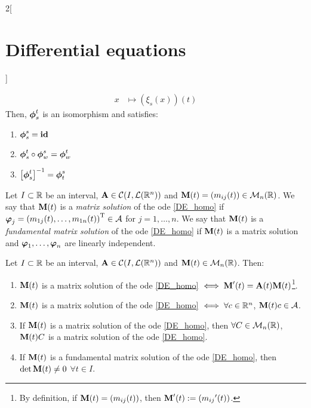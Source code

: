 \documentclass[../../../main.tex]{subfiles}
\begin{document}
\begin{multicols}{2}[\section{Differential equations}]
\begin{corollary}
\begin{align*}
      x                               & \longmapsto(\xi_s(x))(t)
    \end{align*}
    Then, $\boldsymbol{\mathrm{\phi}}_s^t$ is an isomorphism and satisfies:
    \begin{enumerate}
      \item $\boldsymbol{\mathrm{\phi}}_s^s=\boldsymbol{\mathrm{\mathrm{id}}}$
      \item $\boldsymbol{\mathrm{\phi}}_s^t\circ\boldsymbol{\mathrm{\phi}}_w^s=\boldsymbol{\mathrm{\phi}}_w^t$
      \item ${\left[\boldsymbol{\mathrm{\phi}}_s^t\right]}^{-1}=\boldsymbol{\mathrm{\phi}}_t^s$
    \end{enumerate}
  \end{corollary}
  \begin{definition}
    Let $I\subset \mathbb{R}$ be an interval, $\boldsymbol{\mathrm{A}}\in\mathcal{C}(I,\mathcal{L}(\mathbb{R}^n))$ and $\boldsymbol{\mathrm{M}}(t)=(m_{ij}(t))\in\mathcal{M}_n(\mathbb{R})$. We say that $\boldsymbol{\mathrm{M}}(t)$ is a \textit{matrix solution} of the ode \eqref{DE_homo} if $\boldsymbol{\mathrm{\varphi}}_j={(m_{1j}(t),\ldots,m_{1n}(t))}^\mathrm{T}\in\mathcal{A}$ for $j=1,\ldots,n$. We say that $\boldsymbol{\mathrm{M}}(t)$ is a \textit{fundamental matrix solution} of the ode \eqref{DE_homo} if $\boldsymbol{\mathrm{M}}(t)$ is a matrix solution and $\boldsymbol{\mathrm{\varphi}}_1,\ldots,\boldsymbol{\mathrm{\varphi}}_n$ are linearly independent.
  \end{definition}
  \begin{prop}
    Let $I\subset \mathbb{R}$ be an interval, $\boldsymbol{\mathrm{A}}\in\mathcal{C}(I,\mathcal{L}(\mathbb{R}^n))$ and $\boldsymbol{\mathrm{M}}(t)\in\mathcal{M}_n(\mathbb{R})$. Then:
    \begin{enumerate}
      \item $\boldsymbol{\mathrm{M}}(t)$ is a matrix solution of the ode \eqref{DE_homo} $\iff\boldsymbol{\mathrm{M}}'(t)=\boldsymbol{\mathrm{A}}(t)\boldsymbol{\mathrm{M}}(t)$\footnote{By definition, if $\boldsymbol{\mathrm{M}}(t)=(m_{ij}(t))$, then $\boldsymbol{\mathrm{M}}'(t):=({m_{ij}}'(t))$.}.
      \item $\boldsymbol{\mathrm{M}}(t)$ is a matrix solution of the ode \eqref{DE_homo} $\iff\forall c\in\mathbb{R}^n$, $\boldsymbol{\mathrm{M}}(t)c\in\mathcal{A}$.
      \item If $\boldsymbol{\mathrm{M}}(t)$ is a matrix solution of the ode \eqref{DE_homo}, then $\forall C\in\mathcal{M}_n(\mathbb{R})$, $\boldsymbol{\mathrm{M}}(t)C$ is a matrix solution of the ode \eqref{DE_homo}.
      \item If $\boldsymbol{\mathrm{M}}(t)$ is a fundamental matrix solution of the ode \eqref{DE_homo}, then $\det\boldsymbol{\mathrm{M}}(t)\ne 0$ $\forall t\in I$.

\end{enumerate}
\end{prop}
\end{multicols}
\end{document}
